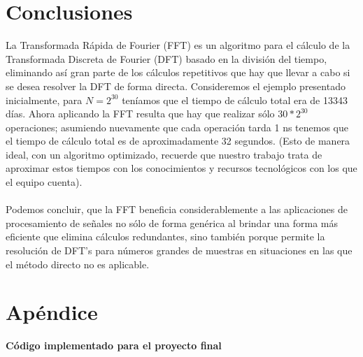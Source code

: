 \documentclass[12pt]{article}
\begin{document}
\section{Conclusiones}
La Transformada Rápida de Fourier (FFT) es un algoritmo para el cálculo de la Transformada Discreta de Fourier (DFT) basado en la división del tiempo, eliminando así gran parte de los cálculos repetitivos que hay que llevar a cabo si se desea resolver la DFT de forma directa. Consideremos el ejemplo presentado inicialmente, para $N=2^{30}$ teníamos que el tiempo de cálculo total era de 13343 días. Ahora aplicando la FFT resulta que hay que realizar sólo $30*2^{30}$ operaciones; asumiendo nuevamente que cada operación tarda 1 ns tenemos que el tiempo de cálculo total es de aproximadamente 32 segundos. (Esto de manera ideal, con un algoritmo optimizado, recuerde que nuestro trabajo trata de aproximar estos tiempos con los conocimientos y recursos tecnológicos con los que el equipo cuenta).
\\
\\
Podemos concluir, que la FFT beneficia considerablemente a las aplicaciones de procesamiento de señales no sólo de forma genérica al brindar una forma más eficiente que elimina cálculos redundantes, sino también porque permite la resolución de DFT's para números grandes de muestras en situaciones en las que el método directo no es aplicable. 

\section{Apéndice}
\textbf{Código implementado para el proyecto final}



\end{document}
